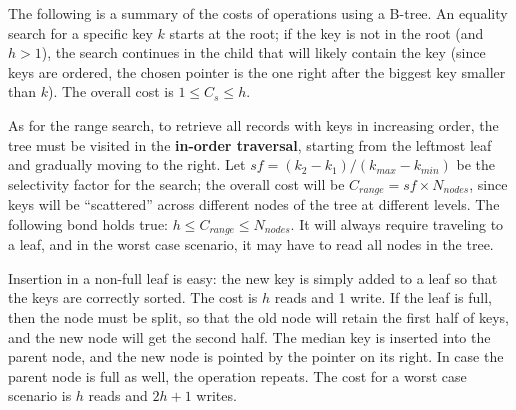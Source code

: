 The following is a summary of the costs of operations using a B-tree. An equality search for a specific key $k$ starts at the root; if the key is not in the root (and $h > 1$), the search continues in the child that will likely contain the key (since keys are ordered, the chosen pointer is the one right after the biggest key smaller than $k$). The overall cost is $1 \leq C_s \leq h$.

As for the range search, to retrieve all records with keys in increasing order, the tree must be visited in the \textbf{in-order traversal}, starting from the leftmost leaf and gradually moving to the right. Let $sf = (k_2 - k_1)/(k_{max} - k_{min})$ be the selectivity factor for the search; the overall cost will be $C_{range} = sf \times N_{nodes}$, since keys will be ``scattered'' across different nodes of the tree at different levels. The following bond holds true: $h \leq C_{range} \leq N_{nodes}$. It will always require traveling to a leaf, and in the worst case scenario, it may have to read all nodes in the tree.

Insertion in a non-full leaf is easy: the new key is simply added to a leaf so that the keys are correctly sorted. The cost is $h$ reads and 1 write. If the leaf is full, then the node must be split, so that the old node will retain the first half of keys, and the new node will get the second half. The median key is inserted into the parent node, and the new node is pointed by the pointer on its right. In case the parent node is full as well, the operation repeats. The cost for a worst case scenario is $h$ reads and $2h + 1$ writes.

